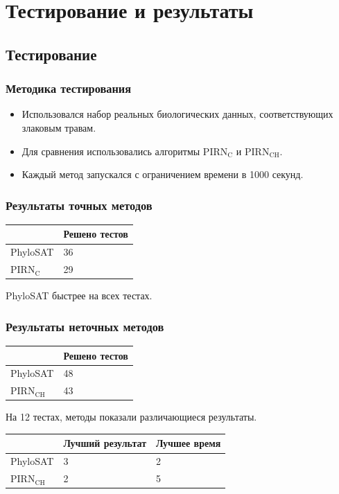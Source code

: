 \documentclass[hyperref={unicode}]{beamer}
\begin{document}
\section{Тестирование и результаты}

\subsection{Тестирование}

\begin{frame}
\frametitle{Методика тестирования}

\begin{itemize}
	\item Использовался набор реальных биологических данных, соответствующих злаковым травам.
	\item Для сравнения использовались алгоритмы $\mathrm{PIRN_C}$ и $\mathrm{PIRN_{CH}}$.
	\item Каждый метод запускался с ограничением времени в 1000 секунд.
\end{itemize}

\end{frame}

\begin{frame}
\frametitle{Результаты точных методов}

\begin{table}
\begin{tabular}{l | l}
	& Решено тестов \\
	\hline
	PhyloSAT & 36 \\
	PIRN$\mathrm{_C}$ & 29 \\
\end{tabular}
\end{table}

PhyloSAT быстрее на всех тестах.

\end{frame}

\begin{frame}
\frametitle{Результаты неточных методов}

\begin{table}
\begin{tabular}{l | l}
	& Решено тестов \\
	\hline
	PhyloSAT & 48 \\
	PIRN$\mathrm{_{CH}}$ & 43 \\
\end{tabular}
\end{table}

На 12 тестах, методы показали различающиеся результаты.

\begin{table}
\begin{tabular}{l | l | l}
	& Лучший результат & Лучшее время \\
	\hline
	PhyloSAT & 3 & 2 \\
	PIRN$\mathrm{_{CH}}$ & 2 & 5 \\
\end{tabular}
\end{table}

\end{frame}
\end{document}
